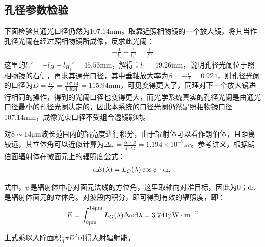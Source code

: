 \documentclass[11pt]{article}
\begin{document}
\subsection{孔径参数检验}
下面检验其通光口径仍然为$107.14\unit{\mm}$。取靠近照相物镜的一个放大镜，将其当作孔径光阑在经过照相物镜所成像，反求此光阑：
\begin{align*}
  -\frac{1}{l_1}+\frac{1}{l_1'}=\frac{1}{f_1'}
\end{align*}
这里的$l_1'=-l_{H}+l_{H_2}'=45.53\unit{\mm}$，解得：$l_1=49.26\unit{\mm}$，说明孔径光阑位于照相物镜的右侧，再求其通光口径，其中垂轴放大率为$\displaystyle\beta=-\frac{l'}{l}=0.924$，则孔径光阑的口径为$\displaystyle D=\frac{D'}{\beta}=\frac{107.14}{0.924}=115.94\unit{\mm}$，可见变得更大了，同理对下一个放大镜进行相同的操作，得到的光阑口径也变得更大，而光学系统真实的孔径光阑是由通光口径最小的孔径光阑决定的，因此本系统的口径光阑仍然是照相物镜口径$107.14\unit{\mm}$，成像光束口径不受组合透镜影响。\par
对$8\sim14\unit{\um}$波长范围内的辐亮度进行积分，由于辐射体可以看作朗伯体，且距离较远，其立体角可以近似计算为$\displaystyle\Delta\omega=\frac{\alpha\times\beta}{4\pi L_c^2}=1.194\times10^{-7}\unit{sr}$。参考讲义\cite*{hand_up}，根据朗伯面辐射体在微面元上的辐照度公式：
\begin{align*}
  {\rm d }E(\lambda)=L_O(\lambda)\cos\psi\cdot{\rm d }\omega
\end{align*}
\par
式中，$\psi$是辐射体中心对面元法线的方位角，这里取轴向对准目标，因此为0；${\rm d}\omega$是辐射体面元的立体角。对波段内积分，即可得到有效的辐照度，即：
\begin{align*}
  E=\int_{8\unit{\um}}^{14\unit{\um}}L_O(\lambda)\Delta\omega{\rm d}\lambda=3.741\unit{\uW\cdot\m^{-2}}
\end{align*}
\par
上式乘以入瞳面积$\displaystyle\frac{1}{4}\pi D^2$可得入射辐射能。
\end{document}
